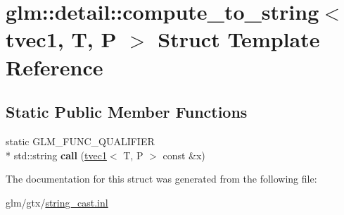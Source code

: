 \hypertarget{structglm_1_1detail_1_1compute__to__string_3_01tvec1_00_01T_00_01P_01_4}{\section{glm\-:\-:detail\-:\-:compute\-\_\-to\-\_\-string$<$ tvec1, T, P $>$ Struct Template Reference}
\label{structglm_1_1detail_1_1compute__to__string_3_01tvec1_00_01T_00_01P_01_4}
}
\subsection*{Static Public Member Functions}
\begin{DoxyCompactItemize}
\item 
\hypertarget{structglm_1_1detail_1_1compute__to__string_3_01tvec1_00_01T_00_01P_01_4_ae459fc0d0afddfc2f977012f95210bd2}{static G\-L\-M\-\_\-\-F\-U\-N\-C\-\_\-\-Q\-U\-A\-L\-I\-F\-I\-E\-R \\*
std\-::string {\bfseries call} (\hyperlink{structglm_1_1tvec1}{tvec1}$<$ T, P $>$ const \&x)}\label{structglm_1_1detail_1_1compute__to__string_3_01tvec1_00_01T_00_01P_01_4_ae459fc0d0afddfc2f977012f95210bd2}

\end{DoxyCompactItemize}


The documentation for this struct was generated from the following file\-:\begin{DoxyCompactItemize}
\item 
glm/gtx/\hyperlink{string__cast_8inl}{string\-\_\-cast.\-inl}\end{DoxyCompactItemize}
